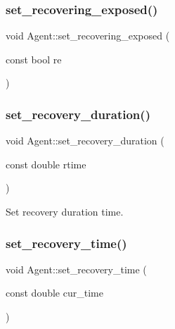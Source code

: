 \mbox{\label{classAgent_a8a0e23235990818d82c04485cb48b97d}} 
\subsubsection{\texorpdfstring{set\+\_\+recovering\+\_\+exposed()}{set\_recovering\_exposed()}}
{\footnotesize\ttfamily void Agent\+::set\+\_\+recovering\+\_\+exposed (\begin{DoxyParamCaption}\item[{const bool}]{re }\end{DoxyParamCaption})\hspace{0.3cm}{\ttfamily [inline]}}

\mbox{\label{classAgent_a98b8e5692686d71e154c65eb9290ce4b}} 
\subsubsection{\texorpdfstring{set\+\_\+recovery\+\_\+duration()}{set\_recovery\_duration()}}
{\footnotesize\ttfamily void Agent\+::set\+\_\+recovery\+\_\+duration (\begin{DoxyParamCaption}\item[{const double}]{rtime }\end{DoxyParamCaption})\hspace{0.3cm}{\ttfamily [inline]}}



Set recovery duration time. 

\mbox{\label{classAgent_a451d3755209b898469cc459266b610a1}} 
\subsubsection{\texorpdfstring{set\+\_\+recovery\+\_\+time()}{set\_recovery\_time()}}
{\footnotesize\ttfamily void Agent\+::set\+\_\+recovery\+\_\+time (\begin{DoxyParamCaption}\item[{const double}]{cur\+\_\+time }\end{DoxyParamCaption})\hspace{0.3cm}{\ttfamily [inline]}}



